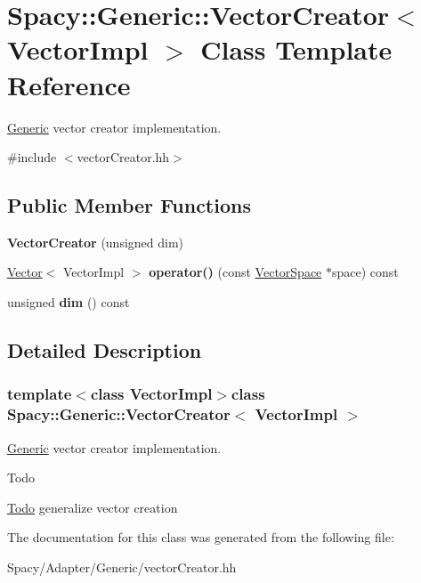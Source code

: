 \hypertarget{classSpacy_1_1Generic_1_1VectorCreator}{}\section{Spacy\+:\+:Generic\+:\+:Vector\+Creator$<$ Vector\+Impl $>$ Class Template Reference}
\label{classSpacy_1_1Generic_1_1VectorCreator}


\hyperlink{namespaceSpacy_1_1Generic}{Generic} vector creator implementation.  




{\ttfamily \#include $<$vector\+Creator.\+hh$>$}

\subsection*{Public Member Functions}
\begin{DoxyCompactItemize}
\item 
\hypertarget{classSpacy_1_1Generic_1_1VectorCreator_a19fcd1bd6edb602294cf1c1eedc64c55}{}{\bfseries Vector\+Creator} (unsigned dim)\label{classSpacy_1_1Generic_1_1VectorCreator_a19fcd1bd6edb602294cf1c1eedc64c55}

\item 
\hypertarget{classSpacy_1_1Generic_1_1VectorCreator_ad394c7a64f4270c89e13af1f75649ad9}{}\hyperlink{classSpacy_1_1Generic_1_1Vector}{Vector}$<$ Vector\+Impl $>$ {\bfseries operator()} (const \hyperlink{classSpacy_1_1VectorSpace}{Vector\+Space} $\ast$space) const \label{classSpacy_1_1Generic_1_1VectorCreator_ad394c7a64f4270c89e13af1f75649ad9}

\item 
\hypertarget{classSpacy_1_1Generic_1_1VectorCreator_a1f1e7616f7319b511655873eed442088}{}unsigned {\bfseries dim} () const \label{classSpacy_1_1Generic_1_1VectorCreator_a1f1e7616f7319b511655873eed442088}

\end{DoxyCompactItemize}


\subsection{Detailed Description}
\subsubsection*{template$<$class Vector\+Impl$>$class Spacy\+::\+Generic\+::\+Vector\+Creator$<$ Vector\+Impl $>$}

\hyperlink{namespaceSpacy_1_1Generic}{Generic} vector creator implementation. 

\begin{DoxyRefDesc}{Todo}
\item[\hyperlink{todo__todo000001}{Todo}]generalize vector creation \end{DoxyRefDesc}


The documentation for this class was generated from the following file\+:\begin{DoxyCompactItemize}
\item 
Spacy/\+Adapter/\+Generic/vector\+Creator.\+hh\end{DoxyCompactItemize}
